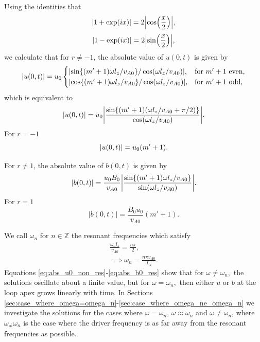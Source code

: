 Using the identities that
\[\abs{1+\exp(ix)} = 2\abs{\cos(\frac{x}{2})},\]
\[\abs{1-\exp(ix)} = 2\abs{\sin(\frac{x}{2})},\]
we calculate that for $r\ne-1$, the absolute value of $u(0,t)$ is given by
\begin{equation}
    \abs{u(0,t)}=u_0
    \begin{cases}
    \abs{\sin\{(m'+1)\omega l_z/v_{A0}\}/\cos(\omega l_z/v_{A0})}, &\text{for}\ m'+1\ \text{even}, \\
    \abs{\cos\{(m'+1)\omega l_z/v_{A0}\}/\cos(\omega l_z/v_{A0})}, &\text{for}\ m'+1\ \text{odd}, \\
    \end{cases}
\end{equation}
which is equivalent to
\begin{equation}
    \label{eq:abs_u0_non_res}
    \abs{u(0,t)}=u_0\abs{\frac{\sin\{(m'+1)(\omega l_z/v_{A0}+\pi/2)\}}{\cos(\omega l_z/v_{A0})}}.
\end{equation}
For $r=-1$
\begin{equation}
     \abs{u(0,t)}=u_0(m'+1).
\end{equation}

For $r\ne1$, the absolute value of $b(0,t)$ is given by
\begin{equation}
    \label{eq:abs_b0_non_res}
    \abs{b(0,t)}=\frac{u_0 B_0}{v_{A0}}\abs{\frac{\sin\{(m'+1)\omega l_z/v_{A0}\}}{\sin(\omega l_z/v_{A0})}}.
\end{equation}
For $r=1$
\begin{equation}
    \label{eq:abs_b0_res}
    |b(0,t)|=\frac{B_0 u_0}{v_{A0}}(m'+1).
\end{equation}

We call $\omega_n$ for $n\in \mathds{Z}$ the resonant frequencies which satisfy
\begin{gather}
    \frac{\omega_n l_z}{v_{A0}}=\frac{n\pi}{2}, \\
    \label{eq:chap_2_omega_n}
    \implies \omega_n = \frac{n\pi v_{A0}}{L_z}.
\end{gather}
Equations \eqref{eq:abs_u0_non_res}-\eqref{eq:abs_b0_res} show that for $\omega\ne\omega_n,$
the solutions oscillate about a finite value, but for $\omega=\omega_n,$
then either $u$ or $b$ at the loop apex grows linearly with time. In Sections \ref{sec:case_where_omega=omega_n}-\ref{sec:case_where_omega_ne_omega_n} we investigate the solutions for the cases where $\omega=\omega_n$, $\omega\approx\omega_n$ and $\omega\ne\omega_n$, where $\omega_\ne \omega_n$ is the case where the driver frequency is as far away from the resonant frequencies as possible.

